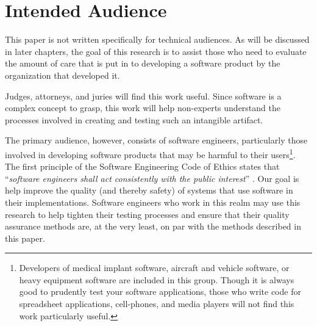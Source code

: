 \section{Intended Audience}

This paper is not written specifically for technical audiences. As will be
discussed in later chapters, the goal of this research is to assist those who
need to evaluate the amount of care that is put in to developing a software
product by the organization that developed it.

Judges, attorneys, and juries will find this work useful. Since software is a 
complex concept to grasp, this work will help non-experts understand the 
processes involved in creating and testing such an intangible artifact.

The primary audience, however, consists of software engineers, particularly
those involved in developing software products that may be harmful to their
users\footnote{Developers of medical implant software, aircraft and vehicle
software, or heavy equipment software are included in this group. Though it is
always good to prudently test your software applications, those who write code
for spreadsheet applications, cell-phones, and media players will not find this
work particularly useful.}. The first principle of the Software Engineering Code
of Ethics states that ``\textit{software engineers shall act consistently with
the public interest}'' \cite{SECODE}. Our goal is help improve the quality (and
thereby safety) of systems that use software in their implementations. Software
engineers who work in this realm may use this research to help tighten their
testing processes and ensure that their quality assurance methods are, at the
very least, on par with the methods described in this paper.

